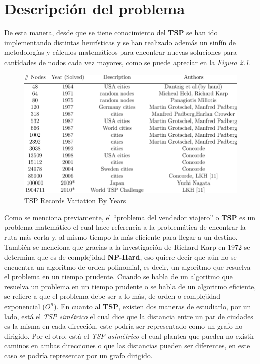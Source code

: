         \section{Descripción del problema}
            De esta manera, desde que se tiene conocimiento del \textbf{TSP} se han ido implementando distintas heurísticas y se han realizado además un sinfín de metodologías y cálculos matemáticos para encontrar nuevas soluciones para cantidades de nodos cada vez mayores, como se puede apreciar en la \textit{Figura 2.1}.
            \newpage
            \begin{figure}[ht]
                \centering
                \includegraphics{imgs/TSP-Records-Variation-By-Years-3.png}
                \caption{TSP Records Variation By Years\parencite{np}}
                \label{Ilustracion 1}
            \end{figure}            
            Como se menciona previamente, el ``problema del vendedor viajero'' o \textbf{TSP} es un problema matemático el cual hace referencia a la problemática de encontrar la ruta más corta y, al mismo tiempo la más eficiente para llegar a un destino.  
            \newline
            \newline
            También se menciona que gracias a la investigación de Richard Karp en 1972 se determina que es de complejidad \textbf{NP-Hard}, eso quiere decir que aún no se encuentra un algoritmo de orden polinomial, es decir, un algoritmo que resuelva el problema en un tiempo prudente.  
            \newline
            \newline
            Cuando se habla de un algoritmo que resuelva un problema en un tiempo prudente o se habla de un algoritmo eficiente, se refiere a que el problema debe ser a lo más, de orden o complejidad exponencial (\(O^n\)). 
            \newline
            \newline
            En cuanto al \textbf{TSP}, existen dos maneras de estudiarlo, por un lado, está el \textit{TSP simétrico} el cual dice que la distancia entre un par de ciudades es la misma en cada dirección, este podría ser representado como un grafo no dirigido. Por el otro, está el \textit{TSP asimétrico} el cual plantea que pueden no existir caminos en ambas direcciones o que las distancias pueden ser diferentes, en este caso se podría representar por un grafo dirigido. 
        
